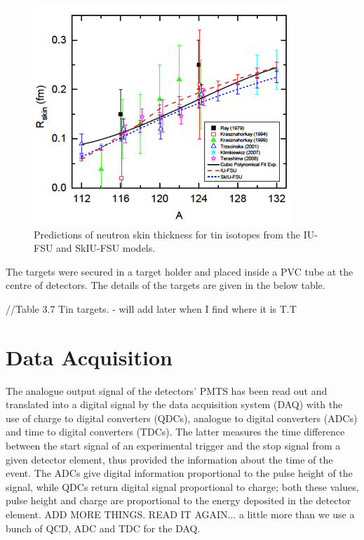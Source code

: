 \begin{figure}[H]
\begin{center}
\includegraphics[scale=0.8]{pictures/png/tiniso.png}
\caption{Predictions of neutron skin thickness for tin isotopes from the IU-FSU and SkIU-FSU models.}
\label{isochain}
\end{center}
\end{figure} 

\indent The targets were secured in a target holder and placed inside a PVC tube at the centre of detectors. The details of the targets are given in the below table.

//Table 3.7 Tin targets. - will add later when I find where it is T.T 

\section{Data Acquisition}

\indent The analogue output signal of the detectors' PMTS has been read out and translated into a digital signal by the data acquisition system (DAQ) with the use of charge to digital converters (QDCs), analogue to digital converters (ADCs) and time to digital converters (TDCs). The latter measures the time difference between the start signal of an experimental trigger and the stop signal from a given detector element, thus provided the information about the time of the event. The ADCs give digital information proportional to the pulse height of the signal, while QDCs return digital signal proportional to charge; both these values, pulse height and charge are proportional to the energy deposited in the detector element.
ADD MORE THINGS. READ IT AGAIN... a little more than we use a bunch of QCD, ADC and TDC for the DAQ.

